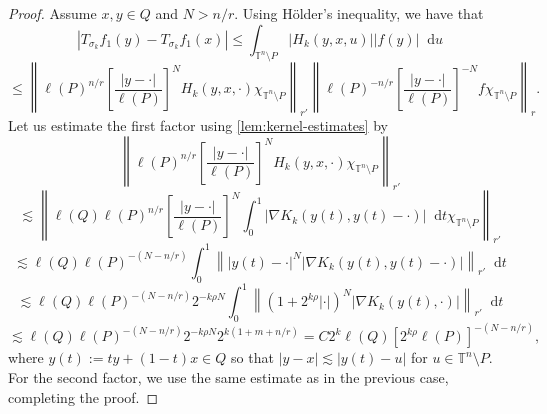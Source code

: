\documentclass[10pt,a4paper]{amsart}
\newcommand*\diff{\mathop{}\!\mathrm{d}}
\begin{document}
\begin{proof}
    Assume $x, y \in Q$ and $N>n/r$. Using H\"older's inequality, we have that
    \begin{equation*}
        |T_{\sigma_k}f_1(y) - T_{\sigma_k}f_1(x)| \leq \int_{\mathbb{T}^n\setminus P} |H_k(y, x, u)||f(y)|\diff u
    \end{equation*}
    \begin{equation*}
        \leq \left\| \ell(P)^{n/r} \left[ \frac{|y-\cdot|}{\ell(P)}
        \right]^N H_k(y, x, \cdot) \chi_{\mathbb{T}^n\setminus P}
        \right\|_{r'} \left\| \ell(P)^{-n/r} \left[ \frac{|y-\cdot|}{\ell(P)}
        \right]^{-N} f\chi_{\mathbb{T}^n\setminus P}
        \right\|_r.
    \end{equation*}
    Let us estimate the first factor using \cref{lem:kernel-estimates} by
    \begin{equation*}
        \left\| \ell(P)^{n/r} \left[ \frac{|y-\cdot|}{\ell(P)}
        \right]^N H_k(y, x, \cdot) \chi_{\mathbb{T}^n\setminus P}
        \right\|_{r'}
    \end{equation*}
    \begin{equation*}
        \lesssim \left\| \ell(Q)\ell(P)^{n/r} \left[ \frac{|y-\cdot|}{\ell(P)}
        \right]^N \int_0^1|\nabla K_k(y(t), y(t) - \cdot)|\diff t \chi_{\mathbb{T}^n\setminus P}
        \right\|_{r'}
    \end{equation*}
    \begin{equation*}
        \lesssim \ell(Q)\ell(P)^{-(N-n/r)} \int_0^1\left\| |y(t) - \cdot|^N |\nabla K_k(y(t), y(t) - \cdot)|
        \right\|_{r'} \diff t
    \end{equation*}
    \begin{equation*}
        \lesssim \ell(Q)\ell(P)^{-(N-n/r)} 2^{-k\rho N} \int_0^1 \left\| (1+2^{k\rho}|\cdot|)^N |\nabla K_k(y(t), \cdot)| 
        \right\|_{r'} \diff t
    \end{equation*}
    \begin{equation*}
        \lesssim \ell(Q)\ell(P)^{-(N-n/r)} 2^{-k\rho N} 2^{k(1+m+n/r)} = C 2^k \ell(Q)[2^{k\rho}\ell(P)]^{-(N-n/r)},
    \end{equation*}
    where $y(t) := ty + (1-t)x \in Q$ so that $|y-x|\lesssim|y(t)-u|$ for $u \in \mathbb{T}^n\setminus P$. For the second factor, we use the same estimate as in the previous case, completing the proof.
\end{proof}
\end{document}

